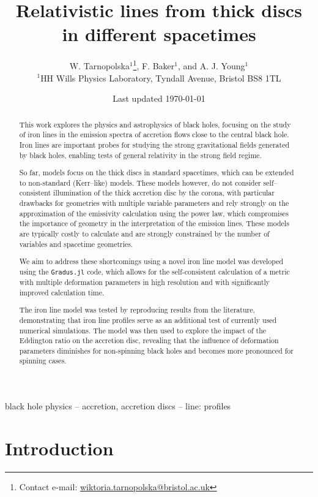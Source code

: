 \documentclass[fleqn,usenatbib,useAMS]{mnras}
\title[Relativistic disc lines]{Relativistic lines from thick discs in different spacetimes}
\author[W. Tarnopolska, et al.]{W. Tarnopolska$^{1}$\thanks{Contact e-mail: \href{mailto:wiktoria.tarnopolska@bristol.ac.uk}{wiktoria.tarnopolska@bristol.ac.uk}}, F. Baker$^{1}$, and A. J. Young$^{1}$ \\
$^{1}$HH Wills Physics Laboratory, Tyndall Avenue, Bristol BS8 1TL}
\date{Last updated \today}
\begin{document}
\label{firstpage}
\pagerange{\pageref{firstpage}--\pageref{lastpage}}
\maketitle

\begin{abstract}
This work explores the physics and astrophysics of black holes, focusing on the study of iron lines in the emission spectra of accretion flows close to the central black hole. Iron lines are important probes for studying the strong gravitational fields generated by black holes, enabling tests of general relativity in the strong field regime. 

So far, models focus on the thick discs in standard spacetimes, which can be extended to non-standard (Kerr--like) models. These models however, do not consider self--consistent illumination of the thick accretion disc by the corona, with particular drawbacks for geometries with multiple variable parameters and rely strongly on the approximation of the emissivity calculation using the power law, which compromises the importance of geometry in the interpretation of the emission lines. These models are typically costly to calculate and are strongly constrained by the number of variables and spacetime geometries. 

We aim to address these shortcomings using a novel iron line model was developed using the {\tt Gradus.jl} code, which allows for the self-consistent calculation of a metric with multiple deformation parameters in high resolution and with significantly improved calculation time.

The iron line model was tested by reproducing results from the literature, demonstrating that iron line profiles serve as an additional test of currently used numerical simulations. The model was then used to explore the impact of the Eddington ratio on the accretion disc, revealing that the influence of deformation parameters diminishes for non-spinning black holes and becomes more pronounced for spinning cases. 

\end{abstract}

\begin{keywords}
black hole physics -- accretion, accretion discs -- line: profiles
\end{keywords}

\section{Introduction}
\end{document}
